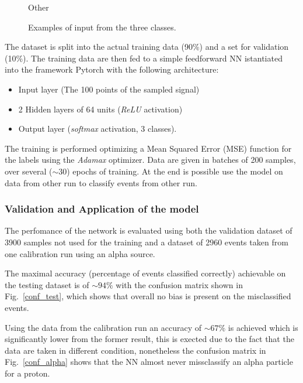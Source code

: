 \begin{figure}[htb]
\begin{minipage}[b]{0.45\textwidth}
  \caption{Other}
  \end{minipage}
  \caption{Examples of input from the three classes.}
  \label{input}
\end{figure}

The dataset is split into the actual training data (\num{90}\%) and a set for validation (\num{10}\%). The training data are then fed to a simple feedforward NN istantiated into the framework Pytorch with the following architecture:

\begin{itemize}
	\item Input layer (The \num{100} points of the sampled signal)
	\item 2 Hidden layers of 64 units (\emph{ReLU} activation)
	\item Output layer (\emph{softmax} activation, 3 classes).
\end{itemize}

The training is performed optimizing a Mean Squared Error (MSE) function for the labels using the \emph{Adamax} optimizer. Data are given in batches of 200 samples, over several ($\sim 30$) epochs of training. At the end is possible use the model on data from other run to classify events from other run.

\subsubsection{Validation and Application of the model}

The perfomance of the network is evaluated using both the validation dataset of \num{3900} samples not used for the training and a dataset of 2960 events taken from one calibration run using an alpha source.


The maximal accuracy (percentage of events classified correctly) achievable on the testing dataset is of $\sim\num{94} \%$ with the confusion matrix shown in Fig.~\ref{conf_test}, which shows that overall no bias is present on the misclassified events.


Using the data from the calibration run an accuracy of $\sim\num{67} \%$ is achieved which is significantly lower from the former result, this is exected due to the fact that the data are taken in different condition, nonetheless the confusion matrix in Fig.~\ref{conf_alpha} shows that the NN almost never missclassify an alpha particle for a proton.

